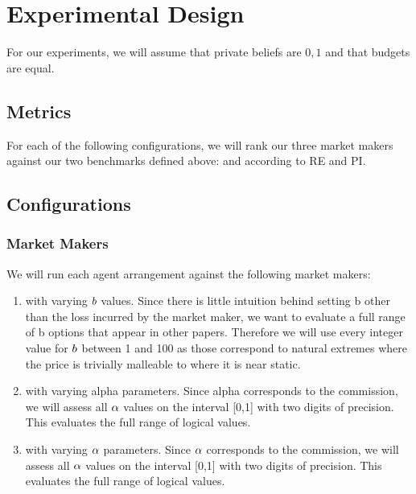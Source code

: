 \section{Experimental Design}
For our experiments, we will assume that private beliefs are ${0,1}$ and that budgets are equal.
\subsection{Metrics}
For each of the following configurations, we will rank our three market makers against our two benchmarks defined above:  and  according to RE and PI.

\subsection{Configurations}
\subsubsection{Market Makers}
We will run each agent arrangement against the following market makers:
\begin{enumerate}
\item {} with varying $b$ values. Since there is little intuition behind setting b other than the loss incurred by the market maker, we want to evaluate a full range of b options that appear in other papers. Therefore we will use every integer value for $b$ between 1 and 100 as those correspond to natural extremes where the price is trivially malleable to where it is near static.

\item {} with varying alpha parameters. Since alpha corresponds to the commission, we will assess all $\alpha$ values on the interval [0,1] with two digits of precision. This evaluates the full range of logical values.

\item {} with varying $\alpha$ parameters. Since $\alpha$ corresponds to the commission, we will assess all $\alpha$ values on the interval [0,1] with two digits of precision. This evaluates the full range of logical values.
\end{enumerate}

